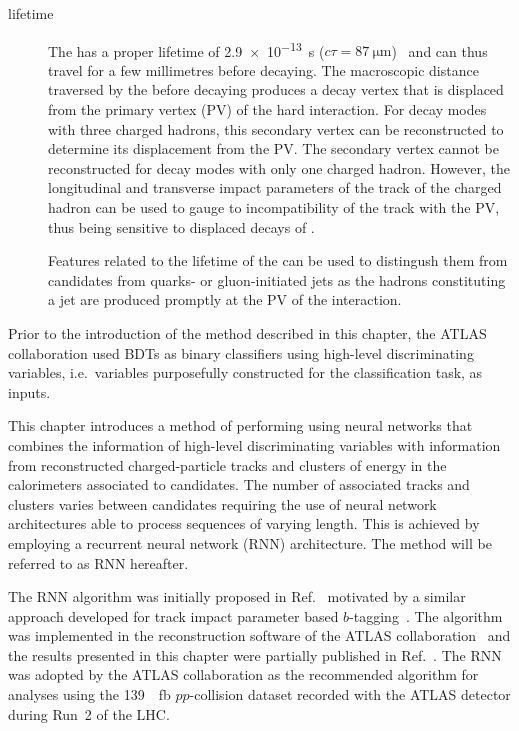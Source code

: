 \begin{description}
\item[\taulepton lifetime] The \taulepton has a proper lifetime of
  \SI{2.9e-13}{\second}
  ($c \tau = \SI{87}{\micro\metre}$)~\cite{pdg2020} and can thus
  travel for a few millimetres before decaying. The macroscopic
  distance traversed by the \taulepton before decaying produces a
  decay vertex that is displaced from the primary vertex (PV) of the
  hard interaction. For \taulepton decay modes with three charged
  hadrons, this secondary vertex can be reconstructed to determine its
  displacement from the PV. The secondary vertex cannot be
  reconstructed for decay modes with only one charged hadron. However,
  the longitudinal and transverse impact parameters of the track of
  the charged hadron can be used to gauge to incompatibility of the
  track with the PV, thus being sensitive to displaced decays of
  \tauleptons.

  Features related to the lifetime of the \taulepton can be used to
  distingush them from \tauhadvis candidates from quarks- or
  gluon-initiated jets as the hadrons constituting a jet are produced
  promptly at the PV of the interaction.
\end{description}
Prior to the introduction of the method described in this chapter, the
ATLAS collaboration used BDTs as binary classifiers using high-level
discriminating variables, i.e.\ variables purposefully constructed for
the classification task, as inputs.

This chapter introduces a method of performing \tauid using neural
networks that combines the information of high-level discriminating
variables with information from reconstructed charged-particle tracks
and clusters of energy in the calorimeters associated to \tauhadvis
candidates. The number of associated tracks and clusters varies
between candidates requiring the use of neural network architectures
able to process sequences of varying length. This is achieved by
employing a recurrent neural network (RNN) architecture. The method
will be referred to as RNN \tauid hereafter.

The RNN \tauid algorithm was initially proposed in
Ref.~\cite{cdeutsch-master} motivated by a similar approach developed
for track impact parameter based
$b$-tagging~\cite{ATL-PHYS-PUB-2017-003}. The algorithm was
implemented in the reconstruction software of the ATLAS
collaboration~\cite{ATL-SOFT-PUB-2021-001} and the results presented
in this chapter were partially published in
Ref.~\cite{ATL-PHYS-PUB-2019-033}. The RNN \tauid was adopted by the
ATLAS collaboration as the recommended \tauid algorithm for analyses
using the \SI{139}{\per\femto\barn} $pp$-collision dataset recorded
with the ATLAS detector during Run~2 of the LHC.

